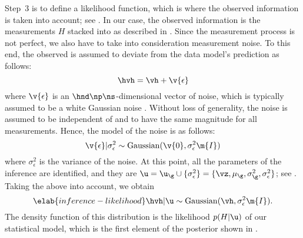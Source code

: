 Step~3 is to define a likelihood function, which is where the observed
information is taken into account; see . In our case,
the observed information is the measurements $H$ stacked into \hvh as described
in . Since the measurement process is not perfect, we
also have to take into consideration measurement noise. To this end, the
observed \hvh is assumed to deviate from the data model's prediction \vh as
follows:
\[
  \hvh = \vh + \v{\epsilon}
\]
where $\v{\epsilon}$ is an $\hnd \np \ns$-dimensional vector of noise, which is
typically assumed to be a white Gaussian noise \cite{rasmussen2006,
marzouk2009}. Without loss of generality, the noise is assumed to be independent
of \g and to have the same magnitude for all measurements. Hence, the model of
the noise is as follows:
\[
  \v{\epsilon} | \sigma^2_\epsilon \sim \mathrm{Gaussian}(\v{0}, \sigma^2_\epsilon \m{I})
\]
where $\sigma^2_\epsilon$ is the variance of the noise. At this point, all the
parameters of the inference are identified, and they are $\u = \u_\g \cup \{
\sigma_\epsilon^2 \} = \{ \vz, \mu_\g, \sigma_\g^2, \sigma_\epsilon^2 \}$; see
. Taking the above into account, we obtain
\begin{equation} \elab{inference-likelihood}
  \hvh | \u \sim \mathrm{Gaussian}(\vh, \sigma_\epsilon^2 \m{I}).
\end{equation}
The density function of this distribution is the likelihood $p(H | \u)$ of our
statistical model, which is the first element of the posterior shown in
.

